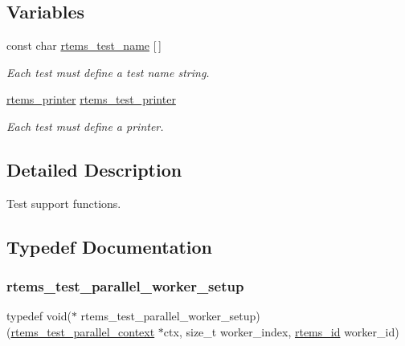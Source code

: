 \subsection*{Variables}
\begin{DoxyCompactItemize}
\item 
\mbox{\label{group__RTEMSTest_ga65ef8af5fce3a12e0ae88a4313008fc0}} 
const char \mbox{\hyperlink{group__RTEMSTest_ga65ef8af5fce3a12e0ae88a4313008fc0}{rtems\+\_\+test\+\_\+name}} \mbox{[}$\,$\mbox{]}
\begin{DoxyCompactList}\small\item\em Each test must define a test name string. \end{DoxyCompactList}\item 
\mbox{\label{group__RTEMSTest_ga58d3560fdfc29e8d20723404c2c062fb}} 
\mbox{\hyperlink{structrtems__printer}{rtems\+\_\+printer}} \mbox{\hyperlink{group__RTEMSTest_ga58d3560fdfc29e8d20723404c2c062fb}{rtems\+\_\+test\+\_\+printer}}
\begin{DoxyCompactList}\small\item\em Each test must define a printer. \end{DoxyCompactList}\end{DoxyCompactItemize}


\subsection{Detailed Description}
Test support functions. 



\subsection{Typedef Documentation}
\mbox{\label{group__RTEMSTest_ga89f4019d001f65865999e823e35dfdcb}} 
\subsubsection{\texorpdfstring{rtems\_test\_parallel\_worker\_setup}{rtems\_test\_parallel\_worker\_setup}}
{\footnotesize\ttfamily typedef void($\ast$ rtems\+\_\+test\+\_\+parallel\+\_\+worker\+\_\+setup) (\mbox{\hyperlink{structrtems__test__parallel__context}{rtems\+\_\+test\+\_\+parallel\+\_\+context}} $\ast$ctx, size\+\_\+t worker\+\_\+index, \mbox{\hyperlink{group__ClassicTasks_gab20892b814dced7dd4e5b9bf42becd57}{rtems\+\_\+id}} worker\+\_\+id)}



